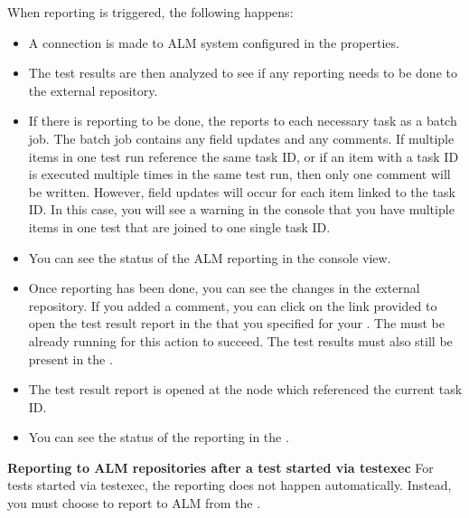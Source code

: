 When reporting is triggered, the following happens:
\begin{itemize}
\item A connection is made to ALM system configured in the \gdproject{} properties. 
\item The test results are then analyzed to see if any reporting needs to be done to the external repository.
\item If there is reporting to be done, the \ite{} reports to each necessary task as a batch job. The batch job contains any field updates and any comments. If multiple items in one test run reference the same task ID, or if an item with a task ID is executed multiple times in the same test run, then only one comment will be written. However, field updates will occur for each item linked to the task ID. In this case, you will see a warning in the console that you have multiple items in one test that are joined to one single task ID.
\item You can see the status of the ALM reporting in the console view. 
\item Once reporting has been done, you can see the changes in the external repository. If you added a comment, you can click on the link provided to open the test result report in the \dash{} that you specified for your \gdproject{}. The \dash{} must be already running for this action to succeed. The test results must also still be present in the \gddb{} .
\item The test result report is opened at the node which referenced the current task ID. 
\item You can see the status of the reporting in the \gdtestsummaryview{} .
\end{itemize}

\textbf{Reporting to ALM repositories after a test started via testexec}
\label{TasksALMReportTestExec}
For tests started via testexec, the reporting does not happen automatically. Instead, you must choose to report to ALM from the \gdtestsummaryview{}.


